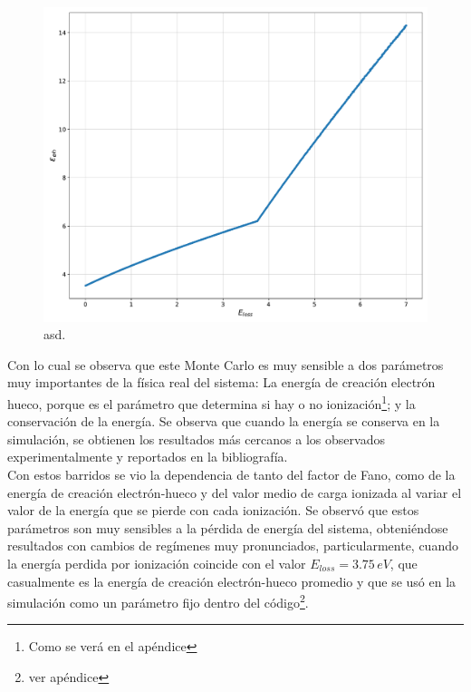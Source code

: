 \begin{figure}%
    \centering
    \includegraphics[scale=0.35]{Figs/E_eh_vs_Eloss_5ktrials_0-7Eloss.pdf}
    \caption{\footnotesize{asd.}}
    \label{fig:CreacionHuecoVsEloss}
\end{figure}
Con lo cual se observa que este Monte Carlo es muy sensible a dos parámetros muy importantes de la física real del sistema: La energía de creación electrón hueco, porque es el parámetro que determina si hay o no ionización\footnote{Como se verá en el apéndice}; y la conservación de la energía. Se observa que cuando la energía se conserva en la simulación, se obtienen los resultados más cercanos a los observados experimentalmente y reportados en la bibliografía.\\
\indent Con estos barridos se vio la dependencia de tanto del factor de Fano, como de la energía de creación electrón-hueco y del valor medio de carga ionizada al variar el valor de la energía que se pierde con cada ionización. Se observó que estos parámetros son muy sensibles a la pérdida de energía del sistema, obteniéndose resultados con cambios de regímenes muy pronunciados, particularmente, cuando la energía perdida por ionización coincide con el valor $E_{loss} = 3.75\,\si{eV}$, que casualmente es la energía de creación electrón-hueco promedio y que se usó en la simulación como un parámetro fijo dentro del código\footnote{ver apéndice}.\\
